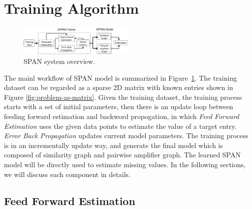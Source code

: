 \section{Training Algorithm}
\label{sec:trainer}

\begin{figure}[!ht]
  \centering  \includegraphics[width=0.5\textwidth]{figures/model.pdf}
  \caption{SPAN system overview.}
  \label{fig:model}
\end{figure}

The mainl workflow of SPAN model is summarized in
Figure~\ref{fig:model}.  The training dataset can be regarded as a
sparse 2D matrix with known entries shown in Figure
\ref{fig:problem-as-matrix}.  Given the training dataset, the training
process starts with a set of initial parameters, then there is an
update loop between feeding forward estimation and backword
propogation, in which {\it Feed Forward Estimation} uses the given
data points to estimate the value of a target entry.  {\it Error Back
  Propagation} updates current model parameters.  The training process
is in an incrementally update way, and generate the final model which
is composed of similarity graph and pairwise amplifier graph. The
learned SPAN model will be directly used to estimate missing values.
In the following sections, we will discuss each component in details.


\subsection{Feed Forward Estimation}
\label{sec:ffe}

